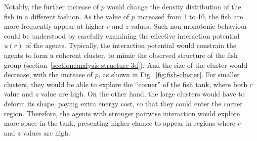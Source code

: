 \documentclass[11pt,twoside]{report}
\begin{document}
Notably, the further increase of $p$ would change the density distribution of the fish in a different fashion. As the value of $p$ increased from 1 to 10, the fish are more frequently appear at higher $r$ and $z$ values. Such non-monotonic behaviour could be understood by carefully examining the effective interaction potential $u(r)$ of the agents.
Typically, the interaction potential would constrain the agents to form a coherent cluster, to mimic the observed structure of the fish group (section~\ref{section:analysis-structure-3d}). And the size of the cluster would decrease, with the increase of $p$, as shown in Fig.~\ref{fig:fish-cluster}.
For smaller clusters, they would be able to explore the ``corner'' of the fish tank, where both $r$ value and $z$ value are high.
On the other hand, the large clusters would have to deform its shape, paying extra energy cost, so that they could enter the corner region.
Therefore, the agents with stronger pairwise interaction would explore more space in the tank, presenting higher chance to appear in regions where $r$ and $z$ values are high.


\end{document}
